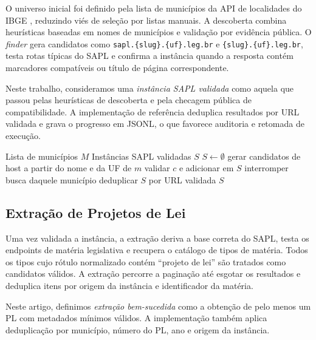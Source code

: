 O universo inicial foi definido pela lista de municípios da API de localidades do IBGE \cite{ibge_localidades_api}, reduzindo viés de seleção por listas manuais. A descoberta combina heurísticas baseadas em nomes de municípios e validação por evidência pública. O \textit{finder} gera candidatos como \texttt{sapl.\{slug\}.\{uf\}.leg.br} e \texttt{\{slug\}.\{uf\}.leg.br}, testa rotas típicas do SAPL e confirma a instância quando a resposta contém marcadores compatíveis ou título de página correspondente.

Neste trabalho, consideramos uma \textit{instância SAPL validada} como aquela que passou pelas heurísticas de descoberta e pela checagem pública de compatibilidade. A implementação de referência deduplica resultados por URL validada e grava o progresso em JSONL, o que favorece auditoria e retomada de execução.

\begin{algorithm}[H]
\caption{Descoberta de instâncias SAPL}
\label{alg:finder-v2}
\begin{algorithmic}[1]
\Require Lista de municípios $M$
\Ensure Instâncias SAPL validadas $S$
\State $S \gets \emptyset$
  \State gerar candidatos de host a partir do nome e da UF de $m$
      \State validar $c$ e adicionar em $S$
      \State interromper busca daquele município
    \EndIf
  \EndFor
\EndFor
\State deduplicar $S$ por URL validada
\State \Return $S$
\end{algorithmic}
\end{algorithm}

\subsection{Extração de Projetos de Lei}

Uma vez validada a instância, a extração deriva a base correta do SAPL, testa os endpoints de matéria legislativa e recupera o catálogo de tipos de matéria. Todos os tipos cujo rótulo normalizado contém ``projeto de lei'' são tratados como candidatos válidos. A extração percorre a paginação até esgotar os resultados e deduplica itens por origem da instância e identificador da matéria.

Neste artigo, definimos \textit{extração bem-sucedida} como a obtenção de pelo menos um PL com metadados mínimos válidos. A implementação também aplica deduplicação por município, número do PL, ano e origem da instância.

